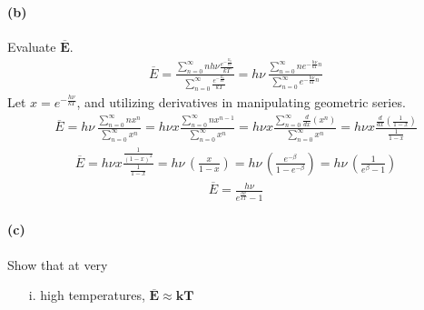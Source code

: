 \documentclass[]{article}
\begin{document}
{		\paragraph{(b)} Evaluate $\bm{\overline{E}}$.
			\begin{equation*}
				\begin{split}
					\overline{E} =  \frac{ \sum\limits_{n=0}^{\infty} nh\nu \frac{ e^{-\frac{E_n}{kT}} }{ kT } }{ \sum\limits_{n=0}^{\infty} \frac{ e^{-\frac{E_n}{kT}} }{ kT } }
					= h\nu \, \frac{ \sum\limits_{n=0}^{\infty} n e^{-\frac{h \nu}{kT}n}  }{ \sum\limits_{n=0}^{\infty} e^{-\frac{h \nu}{kT}n}  }
				\end{split}
			\end{equation*}
			Let $x = e^{-\frac{h \nu}{kT}}$, and utilizing derivatives in manipulating geometric series.
			\begin{equation*}
				\begin{split}
					\overline{E} = h \nu \, \frac{ \sum\limits_{n=0}^{\infty} n x^n  }{ \sum\limits_{n=0}^{\infty} x^n  }
					= h \nu x \frac{ \sum\limits_{n=0}^{\infty} n x^{n-1}  }{ \sum\limits_{n=0}^{\infty} x^n  }
					= h \nu x \frac{ \sum\limits_{n=0}^{\infty} \frac{d}{dx} (x^n)  }{ \sum\limits_{n=0}^{\infty} x^n  }
					= h \nu x \frac{ \frac{d}{dx} \left( \frac{1}{1 - x} \right)  }{ \frac{1}{1 - x}  }
				\end{split}
			\end{equation*}
			\begin{equation*}
				\begin{split}
					\overline{E} = h \nu x \frac{  \frac{1}{(1-x)^2} }{ \frac{1}{1 - x}  }
					= h \nu \, \left( \frac{x}{1-x} \right)
					= h \nu \, \left( \frac{e^{-\beta}}{1 - e^{-\beta}} \right)
					= h \nu \, \left( \frac{1}{e^{\beta} - 1} \right)
				\end{split}
			\end{equation*}
			\begin{equation*}
				\begin{split}
					\overline{E} = \frac{h \nu}{e^{\frac{h \nu}{kT}} - 1}
				\end{split}
			\end{equation*}
		
		
		\paragraph{(c)} Show that at very
			\begin{enumerate}
				\item[i.] high temperatures, $\bm{\overline{E} \approx kT}$

\end{enumerate}}
\end{document}
